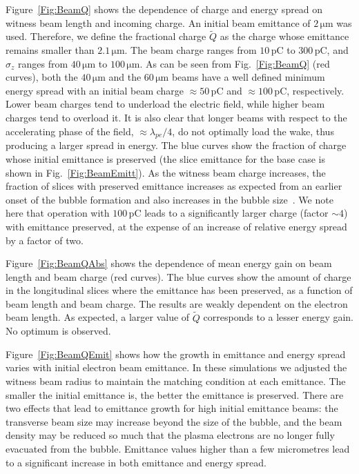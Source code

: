\documentclass[aps,prstab,reprint,amsmath,amssymb,groupedaddress]{revtex4-1}
\newcommand{\unit}[1]{\,\mathrm{#1}}
\begin{document}
Figure~\ref{Fig:BeamQ} shows the dependence of charge and energy spread on witness beam length and incoming charge. An initial beam emittance of $2\unit{\mu m}$ was used. Therefore, we define the fractional charge $\widetilde{Q}$ as the charge whose emittance remains smaller than $2.1\unit{\mu m}$. The beam charge ranges from $10\unit{pC}$ to $300\unit{pC}$, and $\sigma_{z}$ ranges from $40\unit{\mu m}$ to $100\unit{\mu m}$. As can be seen from Fig.~\ref{Fig:BeamQ} (red curves), both the $40\unit{\mu m}$ and the $60\unit{\mu m}$ beams have a well defined minimum energy spread with an initial beam charge $\approx 50\unit{pC}$ and $\approx 100\unit{pC}$, respectively. Lower beam charges tend to underload the electric field, while higher beam charges tend to overload it. It is also clear that longer beams with respect to the accelerating phase of the field, $\approx\lambda_{pe}/4$, do not optimally load the wake, thus producing a larger spread in energy. The blue curves show the fraction of charge whose initial emittance is preserved (the slice emittance for the base case is shown in Fig.~\ref{Fig:BeamEmitt}). As the witness beam charge increases, the fraction of slices with preserved emittance increases \textendash as expected from an earlier onset of the bubble formation \textendash and also increases in the bubble size~\cite{lu:2006-1, lu:2006}. We note here that operation with $100\unit{pC}$ leads to a significantly larger charge (factor $\sim 4$) with emittance preserved, at the expense of an increase of relative energy spread by a factor of two.

Figure~\ref{Fig:BeamQAbs} shows the dependence of mean energy gain on beam length and beam charge (red curves). The blue curves show the amount of charge in the longitudinal slices where the emittance has been preserved, as a function of beam length and beam charge. The results are weakly dependent on the electron beam length. As expected, a larger value of $\widetilde{Q}$ corresponds to a lesser energy gain. No optimum is observed.

Figure~\ref{Fig:BeamQEmit} shows how the growth in emittance and energy spread varies with initial electron beam emittance. In these simulations we adjusted the witness beam radius to maintain the matching condition at each emittance. The smaller the initial emittance is, the better the emittance is preserved. There are two effects that lead to emittance growth for high initial emittance beams: the transverse beam size may increase beyond the size of the bubble, and the beam density may be reduced so much that the plasma electrons are no longer fully evacuated from the bubble. Emittance values higher than a few micrometres lead to a significant increase in both emittance and energy spread. 
\end{document}
